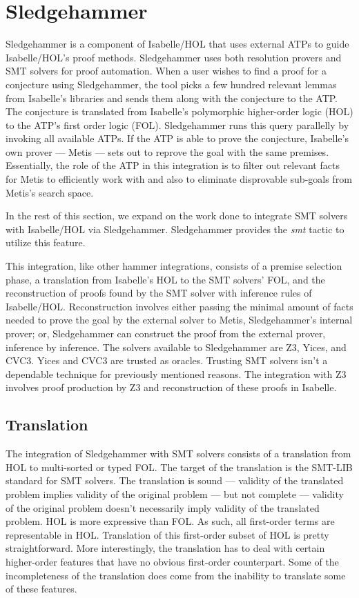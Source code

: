 \documentclass{article}
\begin{document}
\section{Sledgehammer}
\label{sec:sledgehammer}
	Sledgehammer is a component of Isabelle/HOL that uses 
	external ATPs to guide Isabelle/HOL's proof methods. 
	Sledgehammer uses both resolution provers and 
	SMT solvers for proof automation. When a user wishes 
	to find a proof for a conjecture using Sledgehammer, 
	the tool picks a few hundred relevant lemmas from 
	Isabelle's libraries and sends them along 
	with the conjecture to the ATP. The conjecture is 
	translated from Isabelle's polymorphic higher-order 
	logic (HOL) to the ATP's first order logic (FOL).
	Sledgehammer runs this query parallelly by invoking 
	all available ATPs. If the ATP is able to prove 
	the conjecture, Isabelle's own prover --- Metis --- sets 
	out to reprove the goal with the same premises. 
	Essentially, the role of the ATP in this integration 
	is to filter out relevant facts for Metis to 
	efficiently work with and also to eliminate 
	disprovable sub-goals from Metis's search space.
	
	In the rest of this section, we expand on the work 
	done to integrate SMT solvers with Isabelle/HOL via 
	Sledgehammer. Sledgehammer provides the \textit{smt}
	tactic to utilize this feature.
	
	This integration, like other hammer integrations, 
	consists of a premise selection phase, a translation 
	from Isabelle's HOL to the SMT solvers' FOL, and the 
	reconstruction of proofs found by the SMT solver with 
	inference rules of Isabelle/HOL. Reconstruction involves 
	either passing the minimal amount of facts needed 
	to prove the goal by the external solver to Metis, 
	Sledgehammer's internal prover; or, Sledgehammer 
	can construct the proof from the external prover, 
	inference by inference.	The solvers available to 
	Sledgehammer are Z3, Yices, and CVC3. Yices and CVC3 
	are trusted as oracles.	Trusting SMT solvers isn't a 
	dependable technique for previously mentioned reasons. 
	The integration with Z3 involves proof production by 
	Z3 and reconstruction of these proofs in Isabelle.
	
	\subsection{Translation}
		The integration of Sledgehammer with SMT solvers 
		consists of a translation from HOL 
		to multi-sorted or typed FOL. The target 
		of the translation is the SMT-LIB standard for 
		SMT solvers. The translation is sound --- 
		validity of the translated problem implies 
		validity of the original problem --- but not 
		complete --- validity of the original problem 
		doesn't necessarily imply validity of the 
		translated problem. HOL is more expressive 
		than FOL. As such, all first-order terms 
		are representable in HOL. Translation of this 
		first-order subset of HOL is pretty straightforward. 
		More interestingly, the translation has to deal 
		with certain higher-order features that have 
		no obvious first-order counterpart. Some of 
		the incompleteness of the translation does 
		come from the inability to translate some 
		of these features.
		
\end{document}
